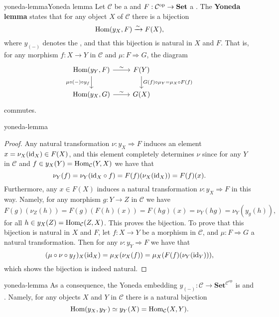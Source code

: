 \begin{topic}{yoneda-lemma}{Yoneda lemma}
    Let $\mathcal{C}$ be a  and $F : \mathcal{C}^\textup{op} \to \textbf{Set}$ a . The \textbf{Yoneda lemma} states that for any object $X$ of $\mathcal{C}$ there is a bijection
    \[ \text{Hom}(y_X, F) \xrightarrow{\sim} F(X) , \]
    where $y_{(-)}$ denotes the , and that this bijection is natural in $X$ and $F$. That is, for any morphism $f : X \to Y$ in $\mathcal{C}$ and  $\mu : F \Rightarrow G$, the diagram
    \[ \begin{tikzcd} \Hom(y_Y, F) \arrow{r}{\sim} \arrow[swap]{d}{\mu \circ (-) \circ y_f} & F(Y) \arrow{d}{G(f) \circ \mu_Y = \mu_X \circ F(f)} \\ \Hom(y_X, G) \arrow{r}{\sim} & G(X) \end{tikzcd} \]
    commutes.
\end{topic}

\begin{example}{yoneda-lemma}
    \begin{proof}
        Any natural transformation $\nu : y_X \Rightarrow F$ induces an element $x = \nu_X(\text{id}_X) \in F(X)$, and this element completely determines $\nu$ since for any $Y$ in $\mathcal{C}$ and $f \in y_X(Y) = \text{Hom}_\mathcal{C}(Y, X)$ we have that
        \[ \nu_{Y}(f) = \nu_{Y}(\text{id}_X \circ f) = F(f)(\nu_X(\text{id}_X)) = F(f)(x) . \]
        Furthermore, any $x \in F(X)$ induces a natural transformation $\nu : y_X \Rightarrow F$ in this way. Namely, for any morphism $g : Y \to Z$ in $\mathcal{C}$ we have
        \[ F(g)(\nu_Z(h)) = F(g)(F(h)(x)) = F(hg)(x) = \nu_Y(hg) = \nu_Y(y_g(h)) , \]
        for all $h \in y_X(Z) = \text{Hom}_\mathcal{C}(Z, X)$. This proves the bijection. To prove that this bijection is natural in $X$ and $F$, let $f : X \to Y$ be a morphism in $\mathcal{C}$, and $\mu : F \Rightarrow G$ a natural transformation. Then for any $\nu : y_Y \Rightarrow F$ we have that
        \[ (\mu \circ \nu \circ y_f)_X(\text{id}_X) = \mu_X(\nu_X(f)) = \mu_X(F(f)(\nu_Y(\text{id}_Y))) , \]
        which shows the bijection is indeed natural.
    \end{proof}
\end{example}

\begin{example}{yoneda-lemma}
    As a consequence, the Yoneda embedding $y_{(-)} : \mathcal{C} \to \textbf{Set}^{\mathcal{C}^\text{op}}$ is  and . Namely, for any objects $X$ and $Y$ in $\mathcal{C}$ there is a natural bijection
    \[ \text{Hom}(y_X, y_Y) \simeq y_Y(X) = \text{Hom}_\mathcal{C}(X, Y) . \]
\end{example}

